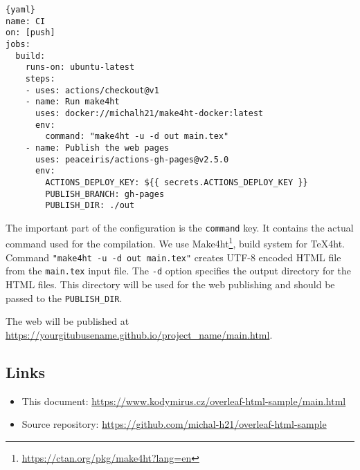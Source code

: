 \documentclass{article}
\newcommand{\cmdname}[1]{\texttt{#1}}
\newcommand\footurl[1]{\footnote{\url{#1}}}
\begin{document}
\begin{lstlisting}{yaml}
name: CI
on: [push]
jobs:
  build:
    runs-on: ubuntu-latest
    steps:
    - uses: actions/checkout@v1
    - name: Run make4ht
      uses: docker://michalh21/make4ht-docker:latest
      env:
        command: "make4ht -u -d out main.tex"
    - name: Publish the web pages
      uses: peaceiris/actions-gh-pages@v2.5.0
      env:
        ACTIONS_DEPLOY_KEY: ${{ secrets.ACTIONS_DEPLOY_KEY }}
        PUBLISH_BRANCH: gh-pages
        PUBLISH_DIR: ./out    
\end{lstlisting}

The important part of the configuration is the \cmdname{command} key. It contains the actual command used for the compilation. We use Make4ht\footurl{https://ctan.org/pkg/make4ht?lang=en}, build system for \TeX4ht.
Command \verb|"make4ht -u -d out main.tex"| creates UTF-8 encoded HTML file from the \cmdname{main.tex} input file. The \texttt{-d} option specifies the output directory for the HTML files. This directory will be used for the web publishing and should be passed to the \verb|PUBLISH_DIR|.

The web will be published at \url{https://yourgitubusename.github.io/project_name/main.html}. 
\subsection{Links}
\begin{itemize}
    \item This document: \url{https://www.kodymirus.cz/overleaf-html-sample/main.html}
    \item Source repository: \url{https://github.com/michal-h21/overleaf-html-sample} 
\end{itemize}
 
\end{document}
